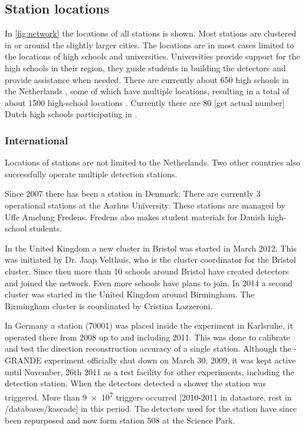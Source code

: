 \subsection{Station locations}

In \cref{fig:network} the locations of all \hisparc stations is shown. Most stations are clustered in or around the slightly larger cities. The locations are in most cases limited to the locations of high schools and universities. Universities provide support for the high schools in their region, they guide students in building the detectors and provide assistance when needed. There are currently about \num{650} high schools in the Netherlands  \cite{duo2016hoofd}, some of which have multiple locations, resulting in a total of about \num{1500} high-school locations \cite{duo2016all}. Currently there are \num{80} [get actual number] Dutch high schools participating in \hisparc.


\subsubsection{International}

Locations of \hisparc stations are not limited to the Netherlands. Two other countries also successfully operate multiple detection stations.

Since 2007 there has been a \hisparc station in Denmark. There are currently 3 operational stations at the Aarhus University. These stations are managed by Uffe Amelung Fredens. Fredens also makes student materials for Danish high-school students.

In the United Kingdom a new cluster in Bristol was started in March 2012. This was initiated by Dr. Jaap Velthuis, who is the cluster coordinator for the Bristol cluster. Since then more than 10 schools around Bristol have created detectors and joined the network. Even more schools have plans to join. In 2014 a second cluster was started in the United Kingdom around Birmingham. The Birmingham cluster is coordinated by Cristina Lazzeroni.

In Germany a station (70001) was placed inside the \kascade experiment in Karlsruhe, it operated there from 2008 up to and including 2011. This was done to calibrate and test the direction reconstruction accuracy of a single \hisparc station. Although the \kascade-GRANDE experiment officially shut down on March 30, 2009, it was kept active until November, 26th 2011 as a test facility for other experiments, including the \hisparc detection station. When the \kascade detectors detected a shower the \hisparc station was triggered. More than \num{9e7} triggers occurred [2010-2011 in datastore, rest in /databases/kascade] in this period. The detectors used for the \kascade station have since been repurposed and now form station 508 at the Science Park.

